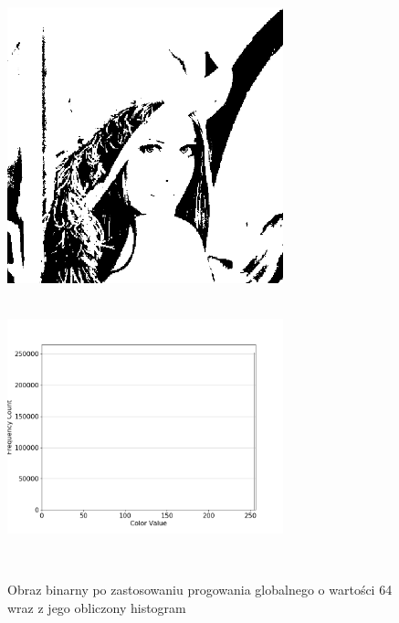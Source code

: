 \documentclass[a4paper,12pt]{book}
\begin{document}
\begin{figure}[H]
	\caption{Obraz binarny po zastosowaniu progowania globalnego o wartości 64 wraz z jego obliczony histogram}
	\includegraphics[width=8cm, height=8cm]{5-5/global-threshold-image-lena-64.png}
	\includegraphics[width=8cm, height=8cm]{5-5/global-threshold-lena-64.png}
	

\end{figure}
\end{document}
